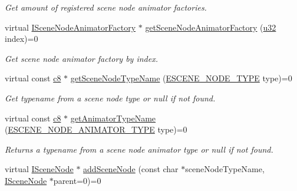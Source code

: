 \begin{DoxyCompactItemize}
\begin{DoxyCompactList}\small\item\em Get amount of registered scene node animator factories. \end{DoxyCompactList}\item 
virtual \hyperlink{classirr_1_1scene_1_1ISceneNodeAnimatorFactory}{I\+Scene\+Node\+Animator\+Factory} $\ast$ \hyperlink{classirr_1_1scene_1_1ISceneManager_a96d8272b74bd0adc9138f17e832dc887}{get\+Scene\+Node\+Animator\+Factory} (\hyperlink{namespaceirr_a0416a53257075833e7002efd0a18e804}{u32} index)=0
\begin{DoxyCompactList}\small\item\em Get scene node animator factory by index. \end{DoxyCompactList}\item 
\mbox{\label{classirr_1_1scene_1_1ISceneManager_a9f8cc1f55b8e067528b7a9a21b7fdd50}} 
virtual const \hyperlink{namespaceirr_a9395eaea339bcb546b319e9c96bf7410}{c8} $\ast$ \hyperlink{classirr_1_1scene_1_1ISceneManager_a9f8cc1f55b8e067528b7a9a21b7fdd50}{get\+Scene\+Node\+Type\+Name} (\hyperlink{namespaceirr_1_1scene_acad3d7ef92a9807d391ba29120f3b7bd}{E\+S\+C\+E\+N\+E\+\_\+\+N\+O\+D\+E\+\_\+\+T\+Y\+PE} type)=0
\begin{DoxyCompactList}\small\item\em Get typename from a scene node type or null if not found. \end{DoxyCompactList}\item 
\mbox{\label{classirr_1_1scene_1_1ISceneManager_aeedfa596280048e6ea6463ff69d23855}} 
virtual const \hyperlink{namespaceirr_a9395eaea339bcb546b319e9c96bf7410}{c8} $\ast$ \hyperlink{classirr_1_1scene_1_1ISceneManager_aeedfa596280048e6ea6463ff69d23855}{get\+Animator\+Type\+Name} (\hyperlink{namespaceirr_1_1scene_a327a1e43872705cf8f3f3342fb307d19}{E\+S\+C\+E\+N\+E\+\_\+\+N\+O\+D\+E\+\_\+\+A\+N\+I\+M\+A\+T\+O\+R\+\_\+\+T\+Y\+PE} type)=0
\begin{DoxyCompactList}\small\item\em Returns a typename from a scene node animator type or null if not found. \end{DoxyCompactList}\item 
virtual \hyperlink{classirr_1_1scene_1_1ISceneNode}{I\+Scene\+Node} $\ast$ \hyperlink{classirr_1_1scene_1_1ISceneManager_a22ea17e8c06a773af9828f7bb70cdc40}{add\+Scene\+Node} (const char $\ast$scene\+Node\+Type\+Name, \hyperlink{classirr_1_1scene_1_1ISceneNode}{I\+Scene\+Node} $\ast$parent=0)=0

\end{DoxyCompactItemize}
